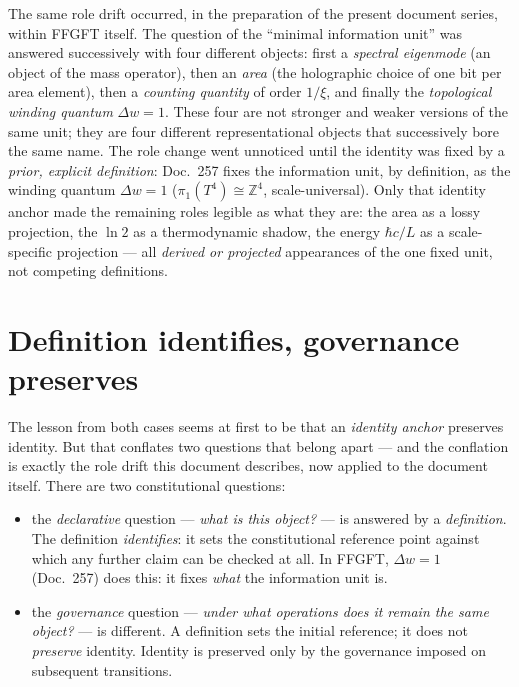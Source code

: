 The same role drift occurred, in the preparation of the present document series, within
FFGFT itself. The question of the \enquote{minimal information unit} was answered
successively with four different objects: first a \emph{spectral eigenmode} (an object of
the mass operator), then an \emph{area} (the holographic choice of one bit per area
element), then a \emph{counting quantity} of order $1/\xi$, and finally the
\emph{topological winding quantum} $\Delta w = 1$. These four are not stronger and weaker
versions of the same unit; they are four different representational objects that
successively bore the same name. The role change went unnoticed until the identity was
fixed by a \emph{prior, explicit definition}: Doc.~257 fixes the information unit, by
definition, as the winding quantum $\Delta w = 1$ ($\pi_1(T^4) \cong \mathbb{Z}^4$,
scale-universal). Only that identity anchor made the remaining roles legible as what they
are: the area as a lossy projection, the $\ln 2$ as a thermodynamic shadow, the energy
$\hbar c/L$ as a scale-specific projection --- all \emph{derived or projected}
appearances of the one fixed unit, not competing definitions.

\section{Definition identifies, governance preserves}

The lesson from both cases seems at first to be that an \emph{identity anchor} preserves
identity. But that conflates two questions that belong apart --- and the conflation is
exactly the role drift this document describes, now applied to the document itself. There
are two constitutional questions:

\begin{itemize}
\item the \emph{declarative} question --- \emph{what is this object?} --- is answered by a
\emph{definition}. The definition \emph{identifies}: it sets the constitutional reference
point against which any further claim can be checked at all. In FFGFT, $\Delta w = 1$
(Doc.~257) does this: it fixes \emph{what} the information unit is.
\item the \emph{governance} question --- \emph{under what operations does it remain the
same object?} --- is different. A definition sets the initial reference; it does not
\emph{preserve} identity. Identity is preserved only by the governance imposed on
subsequent transitions.
\end{itemize}

